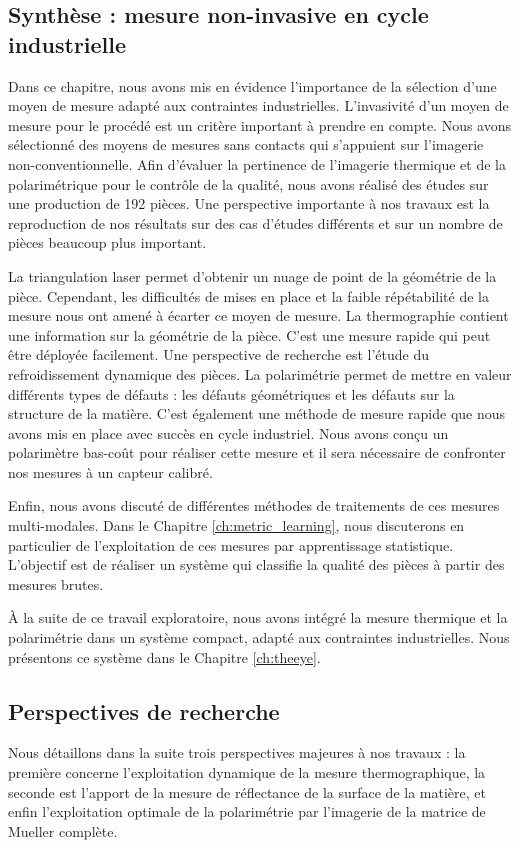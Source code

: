 \subsection{Synthèse : mesure non-invasive en cycle industrielle}
Dans ce chapitre, nous avons mis en évidence l'importance de la sélection d'une moyen de mesure adapté aux contraintes industrielles.
L'invasivité d'un moyen de mesure pour le procédé est un critère important à prendre en compte.
Nous avons sélectionné des moyens de mesures sans contacts qui s'appuient sur l'imagerie non-conventionnelle.
Afin d'évaluer la pertinence de l'imagerie thermique et de la polarimétrique pour le contrôle de la qualité, nous avons réalisé des études sur une production de 192 pièces.
Une perspective importante à nos travaux est la reproduction de nos résultats sur des cas d'études différents et sur un nombre de pièces beaucoup plus important.

La triangulation laser permet d'obtenir un nuage de point de la géométrie de la pièce.
Cependant, les difficultés de mises en place et la faible répétabilité de la mesure nous ont amené à écarter ce moyen de mesure.
La thermographie contient une information sur la géométrie de la pièce.
C'est une mesure rapide qui peut être déployée facilement.
Une perspective de recherche est l'étude du refroidissement dynamique des pièces. 
La polarimétrie permet de mettre en valeur différents types de défauts : les défauts géométriques et les défauts sur la structure de la matière.
C'est également une méthode de mesure rapide que nous avons mis en place avec succès en cycle industriel.
Nous avons conçu un polarimètre bas-coût pour réaliser cette mesure et il sera nécessaire de confronter nos mesures à un capteur calibré.

Enfin, nous avons discuté de différentes méthodes de traitements de ces mesures multi-modales.
Dans le Chapitre \ref{ch:metric_learning}, nous discuterons en particulier de l'exploitation de ces mesures par apprentissage statistique.
L'objectif est de réaliser un système qui classifie la qualité des pièces à partir des mesures brutes.

À la suite de ce travail exploratoire, nous avons intégré la mesure thermique et la polarimétrie dans un système compact, adapté aux contraintes industrielles.
Nous présentons ce système dans le Chapitre \ref{ch:theeye}.

\subsection{Perspectives de recherche}
Nous détaillons dans la suite trois perspectives majeures à nos travaux : la première concerne l'exploitation dynamique de la mesure thermographique, la seconde est l'apport de la mesure de réflectance de la surface de la matière, et enfin l'exploitation optimale de la polarimétrie par l'imagerie de la matrice de Mueller complète.

